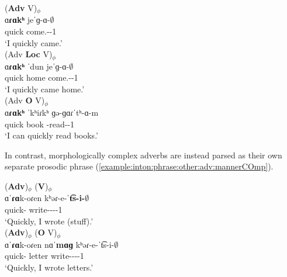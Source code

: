 \begin{exe}
	\ex \label{example:inton:phrase:other:adv:mannerBase} \begin{xlist}
		\ex \glll (\textbf{Adv} V)$_\phi$ \\
		ɑ\textbf{ɾɑkʰ}  jeˈɡ-ɑ-$\emptyset$ \\
		quick   come.{\aorperf}-{\pst}-1{\sg} \\
		\trans `I quickly came.'
		\\ 
		\ex \glll (Adv  \textbf{Loc} V)$_\phi$ \\
		ɑ\textbf{ɾɑkʰ} ˈdun jeˈɡ-ɑ-$\emptyset$ \\
		quick   home come.{\aorperf}-{\pst}-1{\sg} \\
		\trans `I quickly came home.'
		\\ 
		\ex \glll (Adv   \textbf{O} V)$_\phi$ \\
		ɑ\textbf{ɾɑkʰ} ˈkʰiɾkʰ ɡə-ɡɑɾˈtʰ-ɑ-m \\
		quick   book {\ind}-read-{\thgloss}-1{\sg} \\
		\trans `I can quickly read books.'
		\\ 
\end{xlist}\end{exe}

In contrast, morphologically complex adverbs are instead parsed as their own separate prosodic phrase (\ref{example:inton:phrase:other:adv:mannerCOmp}).  


\begin{exe}
	\ex \label{example:inton:phrase:other:adv:mannerCOmp} \begin{xlist}
		\ex \glll (\textbf{Adv})$_\phi$ (\textbf{V})$_\phi$ \\
		ɑˈ\textbf{ɾɑ}k-oɾen   kʰəɾ-e-ˈ\textbf{t͡s-i-$\emptyset$} \\
		quick-{\advz}   write-{\thgloss}-{\aorperf}-{\pst}-1{\sg} \\
		\trans `Quickly, I wrote (stuff).' 
		\\ 
		\ex \glll (\textbf{Adv})$_\phi$ (\textbf{O} V)$_\phi$ \\
		ɑˈ\textbf{ɾɑ}k-oɾen   nɑˈ\textbf{mɑɡ} kʰəɾ-e-ˈt͡s-i-$\emptyset$ \\
		quick-{\advz} letter write-{\thgloss}-{\aorperf}-{\pst}-1{\sg} \\
		\trans `Quickly, I wrote letters.' 
		\\ 
		
\end{xlist}\end{exe}

